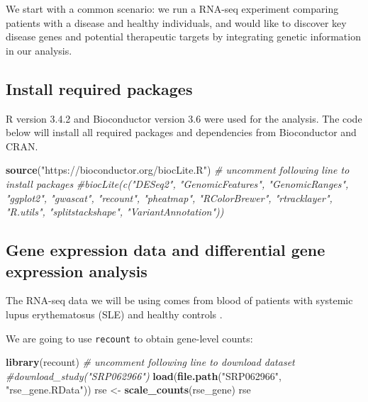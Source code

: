 \documentclass[9pt,a4paper,]{extarticle}
\newenvironment{Shaded}{\begin{snugshade}}{\end{snugshade}}
\newcommand{\KeywordTok}[1]{\textcolor[rgb]{0.13,0.29,0.53}{\textbf{#1}}}
\newcommand{\StringTok}[1]{\textcolor[rgb]{0.31,0.60,0.02}{#1}}
\newcommand{\CommentTok}[1]{\textcolor[rgb]{0.56,0.35,0.01}{\textit{#1}}}
\newcommand{\NormalTok}[1]{#1}
\begin{document}
We start with a common scenario: we run a RNA-seq experiment comparing patients with a disease and healthy individuals, and would like to discover key disease genes and potential therapeutic targets by integrating genetic information in our analysis.

\subsection{Install required packages}\label{install-required-packages}

R version 3.4.2 and Bioconductor version 3.6 were used for the analysis.
The code below will install all required packages and dependencies from Bioconductor and CRAN.

\begin{Shaded}
\begin{Highlighting}[]
\KeywordTok{source}\NormalTok{(}\StringTok{"https://bioconductor.org/biocLite.R"}\NormalTok{)}
\CommentTok{# uncomment following line to install packages}
\CommentTok{#biocLite(c("DESeq2", "GenomicFeatures", "GenomicRanges", "ggplot2", "gwascat", "recount", "pheatmap", "RColorBrewer", "rtracklayer", "R.utils", "splitstackshape", "VariantAnnotation"))}
\end{Highlighting}
\end{Shaded}

\subsection{Gene expression data and differential gene expression analysis}\label{gene-expression-data-and-differential-gene-expression-analysis}

The RNA-seq data we will be using comes from blood of patients with systemic lupus erythematosus (SLE) and healthy controls \citep{Hung2015}.

We are going to use \texttt{recount} \citep{Collado-Torres2017} to obtain gene-level counts:

\begin{Shaded}
\begin{Highlighting}[]
\KeywordTok{library}\NormalTok{(recount)}
\CommentTok{# uncomment following line to download dataset}
\CommentTok{#download_study("SRP062966")}
\KeywordTok{load}\NormalTok{(}\KeywordTok{file.path}\NormalTok{(}\StringTok{"SRP062966"}\NormalTok{, }\StringTok{"rse_gene.RData"}\NormalTok{))}
\NormalTok{rse <-}\StringTok{ }\KeywordTok{scale_counts}\NormalTok{(rse_gene)}
\NormalTok{rse}
\end{Highlighting}
\end{Shaded}
\end{document}
